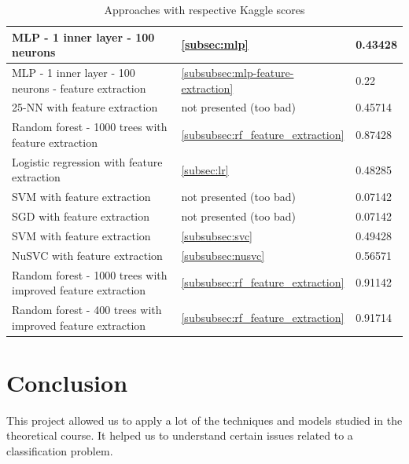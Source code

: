 \documentclass[a4paper, 11pt, oneside]{article}
\begin{document}
\begin{table}[H]
{\begin{tabular}{|l|l|l|}
MLP - 1 inner layer - 100 neurons                           & \ref{subsec:mlp}                                 & 0.43428                                    \\ \hline
MLP - 1 inner layer - 100 neurons - feature extraction      & \ref{subsubsec:mlp-feature-extraction}                                  & 0.22                                       \\ \hline
25-NN with feature extraction                               & not presented (too bad)                               & 0.45714                                    \\ \hline
Random forest - 1000 trees with feature extraction          & \ref{subsubsec:rf_feature_extraction}                                & 0.87428                                    \\ \hline
Logistic regression with feature extraction                 & \ref{subsec:lr}                               & 0.48285                                    \\ \hline
SVM with feature extraction                                 & not presented (too bad)                                 & 0.07142                                    \\ \hline
SGD with feature extraction                                 & not presented (too bad)                                  & 0.07142                                    \\ \hline
SVM with feature extraction                                 & \ref{subsubsec:svc}                          & 0.49428                                    \\ \hline
NuSVC with feature extraction                               & \ref{subsubsec:nusvc}                        & 0.56571                                    \\ \hline
Random forest - 1000 trees with improved feature extraction & \ref{subsubsec:rf_feature_extraction}                                 & 0.91142                                    \\ \hline
Random forest - 400 trees with improved feature extraction & \ref{subsubsec:rf_feature_extraction}                                 & 0.91714                                   \\ \hline
\end{tabular}
}
\caption{Approaches with respective Kaggle scores}
\end{table}

\section{Conclusion}

This project allowed us to apply a lot of the techniques and models studied in the theoretical course. It helped us to understand certain issues related to a classification problem.

\end{document}
